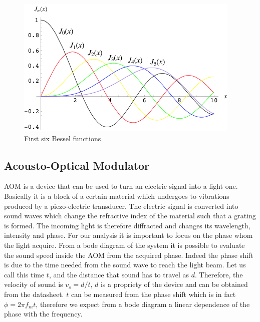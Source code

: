 \documentclass[a4paper,10pt]{article}
\begin{document}
\begin{figure}[H]
\centering
\includegraphics[width=.7\textwidth]{besseltheory}
\caption{First six Bessel functions}
\end{figure}
\subsection{Acousto-Optical Modulator}
AOM is a device that can be used to turn an electric signal into a light one. Basically it is a block of a certain material which undergoes to vibrations produced by a piezo-electric transducer. The electric signal is converted into sound waves which change the refractive index of the material such that a grating is formed. The incoming light is therefore diffracted and  changes its wavelength, intensity and phase. For our analysis it is important to focus on the phase whom the light acquire. From a bode diagram of the system it is possible to evaluate the sound speed inside the AOM from the acquired phase. Indeed the phase shift is due to the time needed from the sound wave to reach the light beam. Let us call this time $t$, and the distance that sound has to travel as $d$. Therefore, the velocity of sound is $v_s = d/t$, $d$ is a propriety of the device and can be obtained from the datasheet. $t$ can be measured from the phase shift which is in fact $\phi = 2\pi f_m t$, therefore we expect from a bode diagram a linear dependence of the phase with the frequency.
\end{document}
